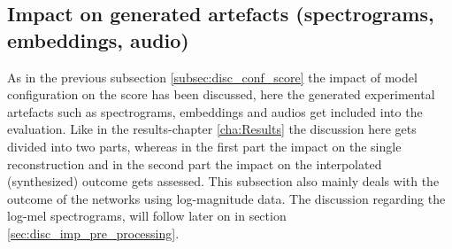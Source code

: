 \subsection{Impact on generated artefacts (spectrograms, embeddings, audio)}
\label{subsec:disc_conf_artifacts}
As in the previous subsection \ref{subsec:disc_conf_score} the impact of model configuration on the score has been discussed, here the generated experimental artefacts such as spectrograms, embeddings and audios get included into the evaluation. Like in the results-chapter \ref{cha:Results} the discussion here gets divided into two parts, whereas in the first part the impact on the single reconstruction and in the second part the impact on the interpolated (synthesized) outcome gets assessed. 
This subsection also mainly deals with the outcome of the networks using log-magnitude data. The discussion regarding the log-mel spectrograms, will follow later on in section \ref{sec:disc_imp_pre_processing}.


